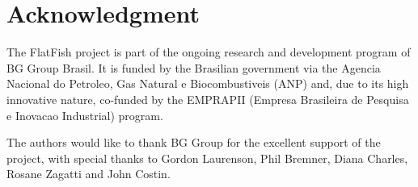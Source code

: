 \documentclass[conference]{IEEEtran}
\begin{document}


\section*{Acknowledgment}
The FlatFish project is part of the ongoing research and development program of BG Group Brasil. It is funded by the Brasilian government via the Agencia Nacional do Petroleo, Gas Natural e Biocombustiveis (ANP) and, due to its high innovative nature, co-funded by the EMPRAPII (Empresa Brasileira de Pesquisa e Inovacao Industrial) program. 

The authors would like to thank BG Group for the excellent support of the project, with special thanks to Gordon Laurenson, Phil Bremner, Diana Charles, Rosane Zagatti and John Costin.







\end{document}
